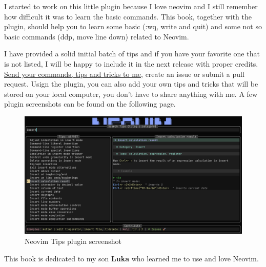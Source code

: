 I started to work on this little plugin because I love neovim and I still remember how difficult it was to learn the basic commands. This book, together with the plugin, should help you to learn some basic (:wq, write and quit) and some not so basic commands (ddp, move line down) related to Neovim.

I have provided a solid initial batch of tips and if you have your favorite one that is not listed, I will be happy to include it in the next release with proper credits. \href{mailto:smalltux@yahoo.com}{Send your commands, tips and tricks to me}, create an issue or submit a pull request. Usign the plugin, you can also add your own tips and tricks that will be stored on your local computer, you don't have to share anything with me. A few plugin screenshots can be found on the following page.

\begin{figure}[h]
  \centering
  \includegraphics[width=\textwidth]{Structure/Images/s2.png}
  \vspace{-2em}
  \caption*{Neovim Tips plugin screenshot}
\end{figure}

\vspace{1cm}

This book is dedicated to my son \textbf{Luka} who learned me to use and love Neovim.
\clearpage
